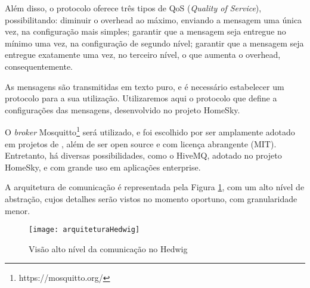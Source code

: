 Além disso, o protocolo \wmqtt{} oferece três tipos de QoS (\textit{Quality of Service}), possibilitando: diminuir o overhead ao máximo, enviando a mensagem uma única vez, na configuração mais simples; garantir que a mensagem seja entregue no mínimo uma vez, na configuração de segundo nível; garantir que a mensagem seja entregue exatamente uma vez, no terceiro nível, o que aumenta o overhead, consequentemente.

As mensagens são transmitidas em texto puro, e é necessário estabelecer um protocolo para a sua utilização. Utilizaremos aqui o protocolo que define a configurações das mensagens, desenvolvido no projeto HomeSky.

O \textit{broker} Mosquitto\footnote{https://mosquitto.org/} será utilizado, e foi escolhido por ser amplamente adotado em projetos de \wiot{}, além de ser open source e com licença abrangente (MIT). Entretanto, há diversas possibilidades, como o HiveMQ, adotado no projeto HomeSky, e com grande uso em aplicações enterprise.

A arquitetura de comunicação é representada pela Figura \ref{fig:diagramaComunicacao}, com um alto nível de abstração, cujos detalhes serão vistos no momento oportuno, com granularidade menor.

\begin{figure}[H]
	\centering
	\caption{Visão alto nível da comunicação no Hedwig}
  \texttt{[image: arquiteturaHedwig]}
\label{fig:diagramaComunicacao}
\end{figure}

